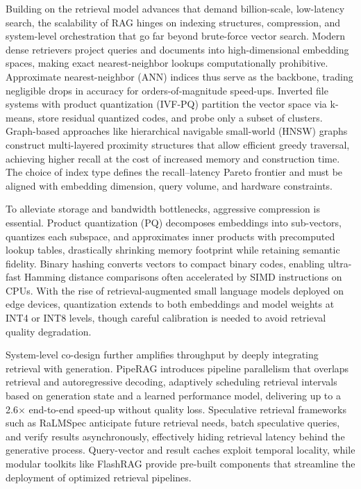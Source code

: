 \documentclass[11pt,a4paper]{article}
\begin{document}
Building on the retrieval model advances that demand billion-scale, low-latency search, the scalability of RAG hinges on indexing structures, compression, and system-level orchestration that go far beyond brute-force vector search. Modern dense retrievers project queries and documents into high-dimensional embedding spaces, making exact nearest-neighbor lookups computationally prohibitive. Approximate nearest-neighbor (ANN) indices thus serve as the backbone, trading negligible drops in accuracy for orders-of-magnitude speed-ups. Inverted file systems with product quantization (IVF-PQ) partition the vector space via k-means, store residual quantized codes, and probe only a subset of clusters. Graph-based approaches like hierarchical navigable small-world (HNSW) graphs construct multi-layered proximity structures that allow efficient greedy traversal, achieving higher recall at the cost of increased memory and construction time. The choice of index type defines the recall--latency Pareto frontier and must be aligned with embedding dimension, query volume, and hardware constraints.

To alleviate storage and bandwidth bottlenecks, aggressive compression is essential. Product quantization (PQ) decomposes embeddings into sub-vectors, quantizes each subspace, and approximates inner products with precomputed lookup tables, drastically shrinking memory footprint while retaining semantic fidelity. Binary hashing converts vectors to compact binary codes, enabling ultra-fast Hamming distance comparisons often accelerated by SIMD instructions on CPUs. With the rise of retrieval-augmented small language models deployed on edge devices, quantization extends to both embeddings and model weights at INT4 or INT8 levels, though careful calibration is needed to avoid retrieval quality degradation.

System-level co-design further amplifies throughput by deeply integrating retrieval with generation. PipeRAG \cite{arxiv:2403.05676v1} introduces pipeline parallelism that overlaps retrieval and autoregressive decoding, adaptively scheduling retrieval intervals based on generation state and a learned performance model, delivering up to a 2.6$\times$ end-to-end speed-up without quality loss. Speculative retrieval frameworks such as RaLMSpec \cite{arxiv:2401.14021v1} anticipate future retrieval needs, batch speculative queries, and verify results asynchronously, effectively hiding retrieval latency behind the generative process. Query-vector and result caches exploit temporal locality, while modular toolkits like FlashRAG \cite{arxiv:2405.13576v1} provide pre-built components that streamline the deployment of optimized retrieval pipelines.
\end{document}
